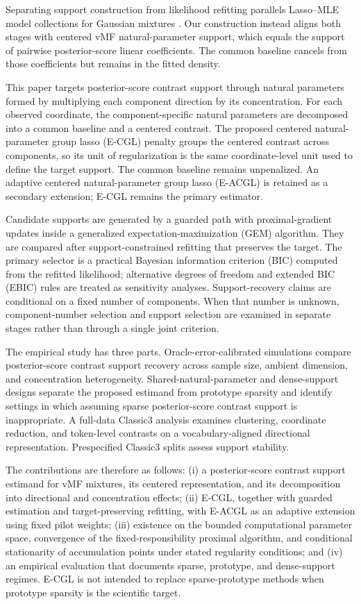 \documentclass[preprint,12pt,authoryear]{elsarticle}
\newcounter{algorithm}
\begin{document}
Separating support construction from likelihood refitting parallels
Lasso--MLE model collections for Gaussian mixtures
\citep{meynet2012thesis,meynet2012sparse}. Our construction instead aligns
both stages with centered vMF natural-parameter support, which equals the
support of pairwise posterior-score linear coefficients. The common baseline
cancels from those coefficients but remains in the fitted density.

This paper targets posterior-score contrast support through natural parameters
formed by multiplying each component direction by its concentration. For each
observed coordinate, the component-specific natural parameters are decomposed
into a common baseline and a centered contrast. The proposed centered
natural-parameter group lasso (E-CGL) penalty
groups the centered contrast across components, so its unit of regularization
is the same coordinate-level unit used to define the target support. The common
baseline remains unpenalized. An adaptive centered natural-parameter group
lasso (E-ACGL) is retained as a secondary extension; E-CGL remains the primary
estimator.

Candidate supports are generated by a guarded path with proximal-gradient
updates inside a generalized expectation-maximization (GEM) algorithm. They
are compared after support-constrained
refitting that preserves the target.
The primary selector is a practical Bayesian information criterion (BIC)
computed from the refitted likelihood; alternative degrees of freedom and
extended BIC (EBIC) rules are treated as sensitivity
analyses. Support-recovery claims are conditional on a fixed number of components.
When that number is unknown, component-number selection and support selection
are examined in separate stages rather than through a single joint criterion.

The empirical study has three parts. Oracle-error-calibrated simulations
compare posterior-score contrast support recovery across sample size, ambient
dimension, and concentration heterogeneity. Shared-natural-parameter and
dense-support designs separate the proposed estimand from prototype sparsity
and identify settings in which assuming sparse posterior-score contrast
support is inappropriate. A full-data Classic3
analysis examines clustering, coordinate reduction, and token-level contrasts
on a vocabulary-aligned directional representation. Prespecified Classic3
splits assess support stability.

The contributions are therefore as follows: (i) a posterior-score contrast support
estimand for vMF mixtures, its centered representation, and its decomposition
into directional and concentration effects; (ii) E-CGL, together with guarded
estimation and target-preserving refitting, with E-ACGL as an adaptive
extension using fixed pilot weights;
(iii) existence on the bounded computational parameter space, convergence of
the fixed-responsibility proximal algorithm, and conditional stationarity of
accumulation points under stated regularity conditions; and
(iv) an empirical evaluation that documents sparse, prototype, and
dense-support regimes.
E-CGL is not intended to replace sparse-prototype methods when prototype
sparsity is the scientific target.
\end{document}
